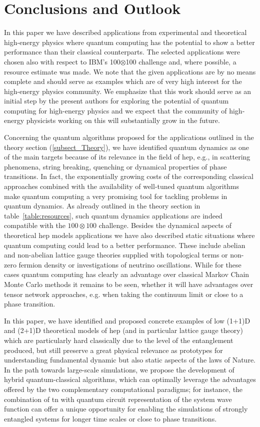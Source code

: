 \section{Conclusions and Outlook\label{sec:conclusion_outlook}}

In this paper we have described applications from experimental and theoretical high-energy physics where quantum computing has the potential to show a better performance than their classical counterparts. The selected applications were chosen also with respect to IBM's 100$\otimes$100 challenge and, where possible, a resource estimate was made. We note that the given applications are by no means complete and should serve as examples which are of very high interest for the high-energy physics community. We emphasize that this work should serve as an initial step by the present authors for exploring the potential of quantum computing for high-energy physics and we expect that the community of high-energy physicists working on this will substantially grow in the future. 

Concerning the quantum algorithms proposed for the applications outlined in the theory section (\ref{subsect_Theory}), we have identified quantum dynamics as one of the main targets because of its relevance in the field of \gls{hep}, e.g., in scattering phenomena, string breaking, quenching or dynamical properties of phase transitions. 
In fact, the exponentially growing costs of the corresponding classical approaches combined with  
the availability of well-tuned quantum algorithms make quantum computing a very promising tool for tackling problems in quantum dynamics. 
As already outlined in the theory section in table~\ref{table:resources}, such quantum dynamics applications are indeed compatible 
with the $100 \otimes 100$ challenge. 
Besides the dynamical aspects of theoretical \gls{hep} models applications we have also described static situations where quantum computing could lead to a better performance. These include abelian and non-abelian lattice gauge theories supplied with topological terms or non-zero fermion density or investigations of neutrino oscillations. While for these cases quantum computing has clearly an advantage over classical Markov Chain Monte Carlo methods it remains to be seen, whether it will have advantages over tensor network approaches, e.g. when taking the continuum limit or close to a phase transition. 

In this paper, we have identified and proposed concrete examples of low (1+1)D and (2+1)D theoretical models of \gls{hep} (and in particular lattice gauge theory) which are particularly hard classically due to the level of the entanglement produced, but still preserve a great physical relevance as prototypes for understanding fundamental dynamic but also static aspects of the laws of Nature.  
In the path towards large-scale simulations, we propose the development of hybrid quantum-classical algorithms, which can optimally leverage the advantages offered by the two complementary computational paradigms; for instance, the combination of \gls{tn} with quantum circuit representation of the system wave function can offer a unique opportunity for enabling the simulations of strongly entangled systems for longer time scales or close to phase transitions.

